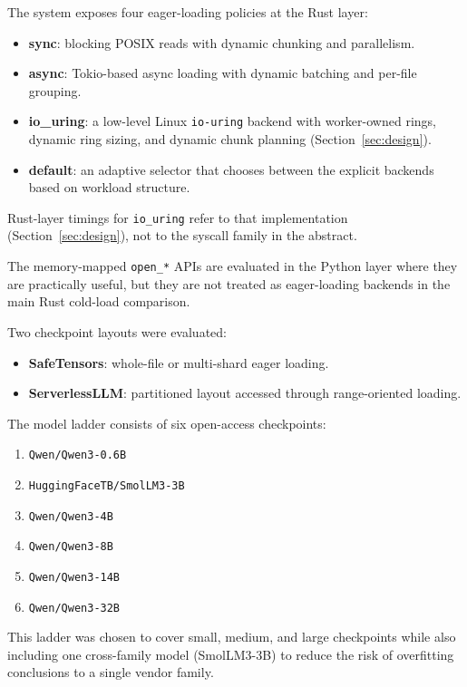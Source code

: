 The system exposes four eager-loading policies at the Rust layer:

\begin{itemize}
\item \textbf{sync}: blocking POSIX reads with dynamic chunking and parallelism.
\item \textbf{async}: Tokio-based async loading with dynamic batching and per-file grouping.
\item \textbf{io\_uring}: a low-level Linux \texttt{io-uring} backend with worker-owned rings, dynamic ring sizing, and dynamic chunk planning (Section~\ref{sec:design}).
\item \textbf{default}: an adaptive selector that chooses between the explicit backends based on workload structure.
\end{itemize}

Rust-layer timings for \texttt{io\_uring} refer to that implementation (Section~\ref{sec:design}), not to the syscall family in the abstract.

The memory-mapped \texttt{open\_*} APIs are evaluated in the Python layer where they are practically useful, but they are not treated as eager-loading backends in the main Rust cold-load comparison.

Two checkpoint layouts were evaluated:

\begin{itemize}
\item \textbf{SafeTensors}: whole-file or multi-shard eager loading.
\item \textbf{ServerlessLLM}: partitioned layout accessed through range-oriented loading.
\end{itemize}

The model ladder consists of six open-access checkpoints:

\begin{enumerate}
\item \texttt{Qwen/Qwen3-0.6B}
\item \texttt{HuggingFaceTB/SmolLM3-3B}
\item \texttt{Qwen/Qwen3-4B}
\item \texttt{Qwen/Qwen3-8B}
\item \texttt{Qwen/Qwen3-14B}
\item \texttt{Qwen/Qwen3-32B}
\end{enumerate}

This ladder was chosen to cover small, medium, and large checkpoints while also including one cross-family model (SmolLM3-3B) to reduce the risk of overfitting conclusions to a single vendor family.

